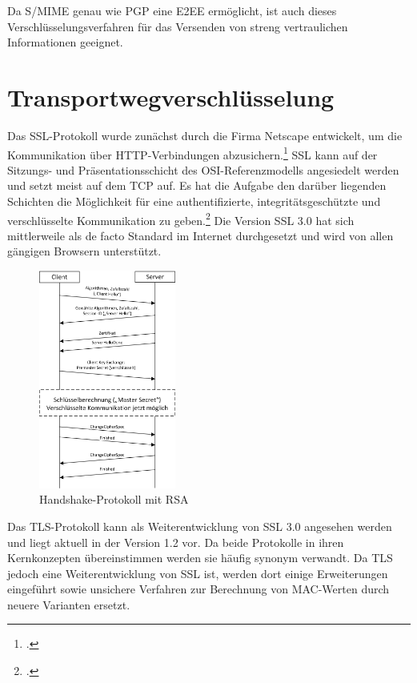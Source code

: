 \documentclass  [paper=a4,
				fontsize=12pt,
				listof=totoc,
				bibliography=totoc
				]{scrreprt}
\begin{document}
				Da \ac{S/MIME} genau wie \ac{PGP} eine \ac{E2EE} ermöglicht, ist auch dieses Verschlüsselungsverfahren für das Versenden von streng vertraulichen Informationen geeignet.
				\newpage
				
				
		\section{Transportwegverschlüsselung}
			Das \ac{SSL}-Protokoll wurde zunächst durch die Firma Netscape entwickelt, um die Kommunikation über \ac{HTTP}-Verbindungen abzusichern.\footcite[Vgl.][S. 796]{Eckert2013} \ac{SSL} kann auf der Sitzungs- und Präsentationsschicht des \ac{OSI}-Referenzmodells angesiedelt werden und setzt meist auf dem \ac{TCP} auf. Es hat die Aufgabe den darüber liegenden Schichten die Möglichkeit für eine authentifizierte, integritätsgeschützte und verschlüsselte Kommunikation zu geben.\footcite[Vgl.][S. 799 ff.]{Eckert2013}
			Die Version \ac{SSL} 3.0 hat sich mittlerweile als de facto Standard im Internet durchgesetzt und wird von allen gängigen Browsern unterstützt.\\
		
			\begin{figure} %
				\centering
				\includegraphics[width=0.4\textwidth]{images/MSC_Transport.png}
				\caption[Handshake-Protokoll mit RSA]{Handshake-Protokoll mit RSA\footnotemark} %
				\label{img:MSC_Transport} %
			\end{figure} 
			Das \ac{TLS}-Protokoll kann als Weiterentwicklung von \ac{SSL} 3.0 angesehen werden und liegt aktuell in der Version 1.2 vor.
			Da beide Protokolle in ihren Kernkonzepten übereinstimmen werden sie häufig synonym verwandt. Da \ac{TLS} jedoch eine Weiterentwicklung von \ac{SSL} ist, werden dort einige Erweiterungen eingeführt sowie unsichere Verfahren zur Berechnung von \ac{MAC}-Werten durch neuere Varianten ersetzt.\\
		
\end{document}

